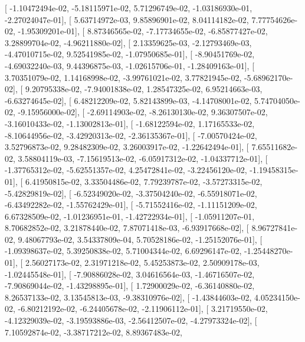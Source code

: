 \documentclass{article}
\begin{document}
       [ -1.10472494e-02,  -5.18115971e-02,   5.71296749e-02,
         -1.03186930e-01,  -2.27024047e-01],
       [  5.63714972e-03,   9.85896901e-02,   8.04114182e-02,
          7.77754626e-02,  -1.95309201e-01],
       [  8.87346565e-02,  -7.17734655e-02,  -6.85877427e-02,
          3.28899704e-02,  -4.96211880e-02],
       [  2.13359625e-03,  -2.12793469e-03,  -4.47010715e-02,
          9.52541985e-02,  -1.07950685e-01],
       [ -8.90451769e-02,  -4.69032240e-03,   9.44396875e-03,
         -1.02615706e-01,  -1.28409163e-01],
       [  3.70351079e-02,   1.14168998e-02,  -3.99761021e-02,
          3.77821945e-02,  -5.68962170e-02],
       [  9.20795338e-02,  -7.94001838e-02,   1.28547325e-02,
          6.95214663e-03,  -6.63274645e-02],
       [  6.48212209e-02,   5.82143899e-03,  -4.14708001e-02,
          5.74704050e-02,  -9.15956000e-02],
       [ -2.69114903e-02,  -8.26130130e-02,   9.36307507e-02,
         -3.16010433e-02,  -1.13002813e-01],
       [ -1.68122594e-02,   1.17165533e-02,  -8.10644956e-02,
         -3.42920313e-02,  -2.36135367e-01],
       [ -7.00570424e-02,   3.52796873e-02,   9.28482309e-02,
          3.26003917e-02,  -1.22642494e-01],
       [  7.65511682e-02,   3.58804119e-03,  -7.15619513e-02,
         -6.05917312e-02,  -1.04337712e-01],
       [ -1.37765312e-02,  -5.62551357e-02,   4.25472841e-02,
         -3.22456120e-02,  -1.19458315e-01],
       [  6.41950815e-02,   3.33504486e-02,   7.79239787e-02,
         -3.57273315e-02,  -5.42829819e-02],
       [ -6.52349020e-02,  -3.37504240e-02,  -6.55918071e-02,
         -6.43492282e-02,  -1.55762429e-01],
       [ -5.71552416e-02,  -1.11151209e-02,   6.67328509e-02,
         -1.01236951e-01,  -1.42722934e-01],
       [ -1.05911207e-01,   8.70682852e-02,   3.21878440e-02,
          7.87071418e-03,  -6.93917668e-02],
       [  8.96727841e-02,   9.48067793e-02,   3.54337809e-04,
          5.70528186e-02,  -1.25152076e-01],
       [ -1.09398637e-02,   5.39250838e-02,   5.71004344e-02,
          6.69296147e-02,  -1.25448270e-01],
       [  2.56027173e-02,   2.31971218e-02,   5.45253873e-02,
          2.50909178e-03,  -1.02445548e-01],
       [ -7.90886028e-02,   3.04616564e-03,  -1.46716507e-02,
         -7.90869044e-02,  -1.43298895e-01],
       [  1.72900029e-02,  -6.36140880e-02,   8.26537133e-02,
          3.13545813e-03,  -9.38310976e-02],
       [ -1.43844603e-02,   4.05234150e-02,  -6.80212192e-02,
         -6.24405678e-02,  -2.11906112e-01],
       [  3.21719550e-02,  -4.12329039e-02,  -3.19593886e-03,
         -2.56412507e-02,  -4.27973324e-02],
       [  7.10592874e-02,  -3.38717212e-02,   8.89367483e-02,
\end{document}
